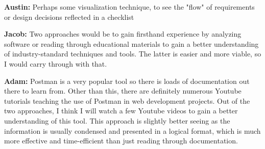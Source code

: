 \documentclass[12pt, titlepage]{article}
\begin{document}
\begin{enumerate}
  \textbf{Austin:} Perhaps some visualization technique, to see the "flow" of requirements or design decisions reflected in a checklist
  
  \textbf{Jacob:} Two approaches would be to gain firsthand experience by analyzing software or reading through educational materials to gain a better understanding of industry-standard techniques and tools. The latter is easier and more viable, so I would carry through with that.

  \textbf{Adam:} Postman is a very popular tool so there is loads of documentation out there to learn from. Other than this, there are definitely numerous Youtube tutorials teaching the use of Postman in web development projects. Out of the two approaches, I think I will watch a few Youtube videos to gain a better understanding of this tool. This approach is slightly better seeing as the information is usually condensed and presented in a logical format, which is much more effective and time-efficient than just reading through documentation. 
\end{enumerate}
\end{document}
